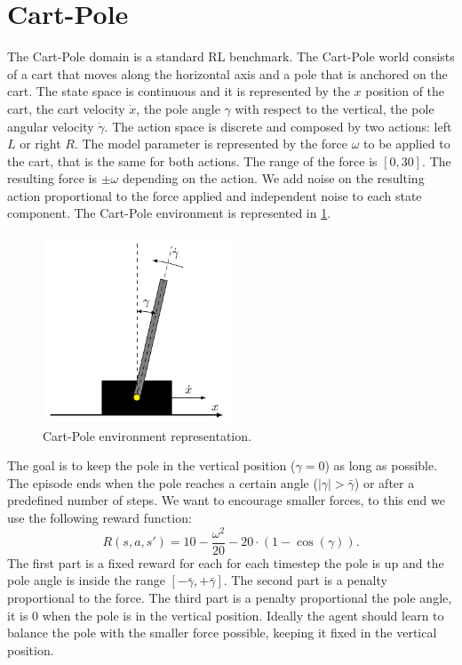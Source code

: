 \section{Cart-Pole}\label{sec:cartpole}
The Cart-Pole domain is a standard RL benchmark. The Cart-Pole world consists of a cart that moves along the horizontal axis and a pole that is anchored on the cart. The state space is continuous and it is represented by the $x$ position of the cart, the cart velocity $\dot{x}$, the pole angle $\gamma$ with respect to the vertical, the pole angular velocity $\dot{\gamma}$. The action space is discrete and composed by two actions: left $L$ or right $R$. The model parameter is represented by the force $\omega$ to be applied to the cart, that is the same for both actions. The range of the force is $[0,30]$. The resulting force is $\pm \omega$ depending on the action. We add noise on the resulting action proportional to the force applied and independent noise to each state component. The Cart-Pole environment is represented in \cref{fig:cartpole-env}. \newline
\begin{figure}[!b]
\centering
\includegraphics[width = 0.5\textwidth]{plots/cartpole/cartpole_env}
\caption{Cart-Pole environment representation.}
\label{fig:cartpole-env}
\end{figure}
The goal is to keep the pole in the vertical position ($\gamma=0$) as long as possible. The episode ends when the pole reaches a certain angle ($|\gamma| > \bar{\gamma}$) or after a predefined number of steps. We want to encourage smaller forces, to this end we use the following reward function:
$$
R(s,a,s') = 10 - \frac{\omega^2}{20} - 20 \cdot (1 - \cos(\gamma)) .
$$
The first part is a fixed reward for each for each timestep the pole is up and the pole angle is inside the range $[-\bar{\gamma}, +\bar{\gamma}]$. The second part is a penalty proportional to the force. The third part is a penalty proportional the pole angle, it is 0 when the pole is in the vertical position. Ideally the agent should learn to balance the pole with the smaller force possible, keeping it fixed in the vertical position. \newline
